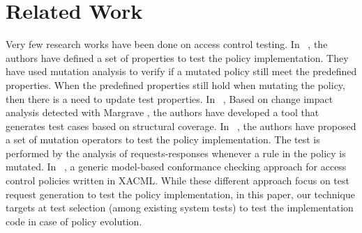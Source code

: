 \section{Related Work}
\label{sec:related}


Very few research works have been done on access control testing. 
In ~\cite{martin06:defining}, the authors have defined a set of properties to test the policy implementation. They have used mutation 
analysis to verify if a mutated policy still meet the predefined properties. When the predefined properties still hold when mutating the policy, 
then there is a need to update test properties.
In ~\cite{martin07:automated}, Based on change impact analysis detected with Margrave \cite{Margrave}, 
the authors have developed a tool that generates test cases based on structural coverage.
In ~\cite{martin07:fault}, the authors have proposed a set of mutation operators to test the policy implementation. The test is performed by the analysis 
of requests-responses whenever a rule in the policy is mutated.
In ~\cite{hu07:conformance}, a generic model-based conformance checking approach for access control policies written in
XACML. While these different approach focus on test request generation to test the policy implementation, in this paper, our technique targets at 
test selection (among existing system tests) to test the implementation code in case of policy evolution. 



